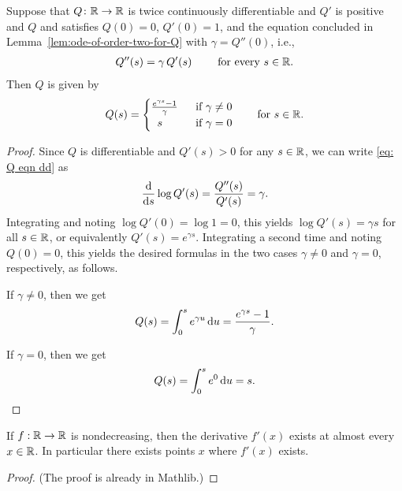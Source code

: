 \begin{lemma}
  \label{lem:solve-Q}
  Suppose that $Q \colon \mathbb{R} \to \mathbb{R}$ is twice continuously differentiable
  and $Q'$ is positive and $Q$
  and satisfies $Q(0)=0$, $Q'(0) = 1$, and the equation concluded in
  Lemma~\ref{lem:ode-of-order-two-for-Q} with $\gamma = Q''(0)$, i.e.,
  \begin{align}\label{eq: Q eqn dd}
  Q''(s) = \gamma \, Q'(s) \qquad \text{ for every } s \in \mathbb{R} .
  \end{align}
  Then $Q$ is given by
  \begin{align*}
  Q(s) = \begin{cases}
    \frac{e^{\gamma s} - 1}{\gamma} & \; \text{ if $\gamma \ne 0$} \\
    \;\; s & \; \text{ if $\gamma = 0$}
    \end{cases}
    \qquad \text{for $s \in \mathbb{R}$.}
  \end{align*}
  \end{lemma}
\begin{proof}
  Since $Q$ is differentiable and $Q'(s)>0$ for any $s \in \mathbb{R}$,
  we can write \eqref{eq: Q eqn dd} as
  \begin{align*}
  \frac{\mathrm{d}}{\mathrm{d} s} \log Q'(s)
    = \frac{Q''(s)}{Q'(s)}
    = \gamma .
  \end{align*}
  Integrating and noting $\log Q'(0) = \log 1 = 0$, this
  yields $\log Q'(s) = \gamma s$ for all $s \in \mathbb{R}$, or equivalently
  $Q'(s) = e^{\gamma s}$. Integrating a second time
  and noting $Q(0) = 0$, this yields the desired formulas
  in the two cases $\gamma \ne 0$ and $\gamma = 0$, respectively, as follows.

  If $\gamma \ne 0$, then we get
  \begin{align*}
  Q(s) = \int_0^s e^{\gamma u} \, \mathrm{d} u = \frac{e^{\gamma s} - 1}{\gamma} .
  \end{align*}

  If $\gamma = 0$, then we get
  \begin{align*}
  Q(s) = \int_0^s e^0 \, \mathrm{d} u = s .
  \end{align*}
\end{proof}

\begin{theorem}
  \label{thm:monotone-ae-differentiable}
  \leanok
  \mathlibok
  If $f : \mathbb{R} \to \mathbb{R}$ is nondecreasing, then the derivative
  $f'(x)$ exists at almost every $x \in \mathbb{R}$.
  In particular there exists points $x$ where $f'(x)$ exists.
\end{theorem}
\begin{proof}
  \leanok
  \mathlibok
  (The proof is already in Mathlib.)
\end{proof}


